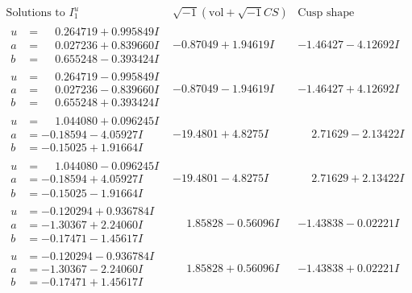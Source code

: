 \documentclass[1p]{elsarticle_modified}
\theoremstyle{definition}
\newcommand{\I}{\sqrt{-1}}
\begin{document}
$$\begin{array}{c|c|c}  
\text{Solutions to }I^u_{1}& \I (\text{vol} + \sqrt{-1}CS) & \text{Cusp shape}\\
 \hline 
\begin{aligned}
u &= \phantom{-}0.264719 + 0.995849 I \\
a &= \phantom{-}0.027236 + 0.839660 I \\
b &= \phantom{-}0.655248 - 0.393424 I\end{aligned}
 & -0.87049 + 1.94619 I & -1.46427 - 4.12692 I \\ \hline\begin{aligned}
u &= \phantom{-}0.264719 - 0.995849 I \\
a &= \phantom{-}0.027236 - 0.839660 I \\
b &= \phantom{-}0.655248 + 0.393424 I\end{aligned}
 & -0.87049 - 1.94619 I & -1.46427 + 4.12692 I \\ \hline\begin{aligned}
u &= \phantom{-}1.044080 + 0.096245 I \\
a &= -0.18594 - 4.05927 I \\
b &= -0.15025 + 1.91664 I\end{aligned}
 & -19.4801 + 4.8275 I & \phantom{-}2.71629 - 2.13422 I \\ \hline\begin{aligned}
u &= \phantom{-}1.044080 - 0.096245 I \\
a &= -0.18594 + 4.05927 I \\
b &= -0.15025 - 1.91664 I\end{aligned}
 & -19.4801 - 4.8275 I & \phantom{-}2.71629 + 2.13422 I \\ \hline\begin{aligned}
u &= -0.120294 + 0.936784 I \\
a &= -1.30367 + 2.24060 I \\
b &= -0.17471 - 1.45617 I\end{aligned}
 & \phantom{-}1.85828 - 0.56096 I & -1.43838 - 0.02221 I \\ \hline\begin{aligned}
u &= -0.120294 - 0.936784 I \\
a &= -1.30367 - 2.24060 I \\
b &= -0.17471 + 1.45617 I\end{aligned}
 & \phantom{-}1.85828 + 0.56096 I & -1.43838 + 0.02221 I \\ \hline\begin{aligned}

\end{aligned}
\end{array}$$
\end{document}
